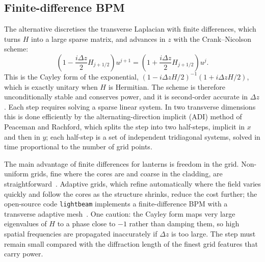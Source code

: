 \documentclass[11pt,a4paper]{article}
\begin{document}
\subsection{Finite-difference BPM}
The alternative discretises the transverse Laplacian with finite differences, which turns $H$ into a large sparse matrix, and advances in $z$ with the Crank--Nicolson scheme:
\begin{equation}
\left( 1 - \frac{i\Delta z}{2} H_{j+1/2} \right) u^{j+1} = \left( 1 + \frac{i\Delta z}{2} H_{j+1/2} \right) u^{j}.
\label{eq:crank}
\end{equation}
This is the Cayley form of the exponential, $(1 - i\Delta z H/2)^{-1}(1 + i\Delta z H/2)$, which is exactly unitary when $H$ is Hermitian. The scheme is therefore unconditionally stable and conserves power, and it is second-order accurate in $\Delta z$. Each step requires solving a sparse linear system. In two transverse dimensions this is done efficiently by the alternating-direction implicit (ADI) method of Peaceman and Rachford, which splits the step into two half-steps, implicit in $x$ and then in $y$; each half-step is a set of independent tridiagonal systems, solved in time proportional to the number of grid points.

The main advantage of finite differences for lanterns is freedom in the grid. Non-uniform grids, fine where the cores are and coarse in the cladding, are straightforward~\cite{Shibayama1999}. Adaptive grids, which refine automatically where the field varies quickly and follow the cores as the structure shrinks, reduce the cost further; the open-source code \texttt{lightbeam} implements a finite-difference BPM with a transverse adaptive mesh~\cite{lightbeam}. One caution: the Cayley form maps very large eigenvalues of $H$ to a phase close to $-1$ rather than damping them, so high spatial frequencies are propagated inaccurately if $\Delta z$ is too large. The step must remain small compared with the diffraction length of the finest grid features that carry power.
\end{document}
